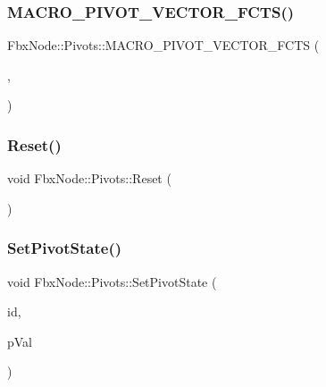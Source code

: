 \subsubsection{\texorpdfstring{M\+A\+C\+R\+O\+\_\+\+P\+I\+V\+O\+T\+\_\+\+V\+E\+C\+T\+O\+R\+\_\+\+F\+C\+T\+S()}{MACRO\_PIVOT\_VECTOR\_FCTS()}\hspace{0.1cm}{\footnotesize\ttfamily [9/9]}}
{\footnotesize\ttfamily Fbx\+Node\+::\+Pivots\+::\+M\+A\+C\+R\+O\+\_\+\+P\+I\+V\+O\+T\+\_\+\+V\+E\+C\+T\+O\+R\+\_\+\+F\+C\+TS (\begin{DoxyParamCaption}\item[{\hyperlink{class_fbx_node_abc071af68acc0b2fa5fd98ce8d40471f}{Geometric\+Scaling}}]{,  }\item[{\hyperlink{class_fbx_node_1_1_pivot_a885264a556ea04dc8baf96a0ef2067b1}{Pivot\+::s\+One\+Vector}}]{ }\end{DoxyParamCaption})}

\mbox{\label{class_fbx_node_1_1_pivots_ac7d51e9cdd4b9c8a384e94b8d868800c}} 
\subsubsection{\texorpdfstring{Reset()}{Reset()}}
{\footnotesize\ttfamily void Fbx\+Node\+::\+Pivots\+::\+Reset (\begin{DoxyParamCaption}{ }\end{DoxyParamCaption})}

\mbox{\label{class_fbx_node_1_1_pivots_abb34f894cdbda44914d8e707d7d7b737}} 
\subsubsection{\texorpdfstring{Set\+Pivot\+State()}{SetPivotState()}}
{\footnotesize\ttfamily void Fbx\+Node\+::\+Pivots\+::\+Set\+Pivot\+State (\begin{DoxyParamCaption}\item[{int}]{id,  }\item[{\hyperlink{class_fbx_node_a153fc75958227fc6728a2233b630b58a}{Fbx\+Node\+::\+E\+Pivot\+State}}]{p\+Val }\end{DoxyParamCaption})}


